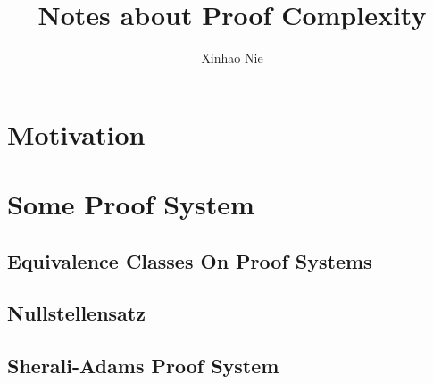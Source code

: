 \documentclass{article}
\begin{document}
\title{Notes about Proof Complexity}
\author{Xinhao Nie}
\maketitle

\section{Motivation}


\section{Some Proof System}
\subsection{Equivalence Classes On Proof Systems}

\subsection{Nullstellensatz}


\subsection{Sherali-Adams Proof System}

\end{document}
